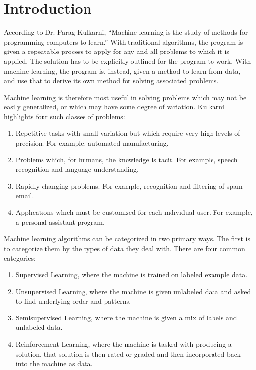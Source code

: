 
\section*{Introduction} %

According to Dr. Parag Kulkarni, ``Machine learning is the study of methods for programming computers to learn.'' \cite{kulkarni} With traditional algorithms, the program is given a repeatable process to apply for any and all problems to which it is applied. The solution has to be explicitly outlined for the program to work. With machine learning, the program is, instead, given a method to learn from data, and use that to derive its own method for solving associated problems. 

Machine learning is therefore most useful in solving problems which may not be easily generalized, or which may have some degree of variation. Kulkarni highlights four such classes of problems: 

\begin{enumerate}  
\item Repetitive tasks with small variation but which require very high levels of precision. For example, automated manufacturing.
\item Problems which, for humans, the knowledge is tacit. For example, speech recognition and language understanding.
\item Rapidly changing problems. For example, recognition and filtering of spam email. 
\item Applications which must be customized for each individual user. For example, a personal assistant program. 
\end{enumerate}

Machine learning algorithms can be categorized in two primary ways. The first is to categorize them by the types of data they deal with. There are four common categories: 

\begin{enumerate}  
\item Supervised Learning, where the machine is trained on labeled example data.
\item Unsupervised Learning, where the machine is given unlabeled data and asked to find underlying order and patterns.
\item Semisupervised Learning, where the machine is given a mix of labels and unlabeled data.
\item Reinforcement Learning, where the machine is tasked with producing a solution, that solution is then rated or graded and then incorporated back into the machine as data. 
\end{enumerate}

